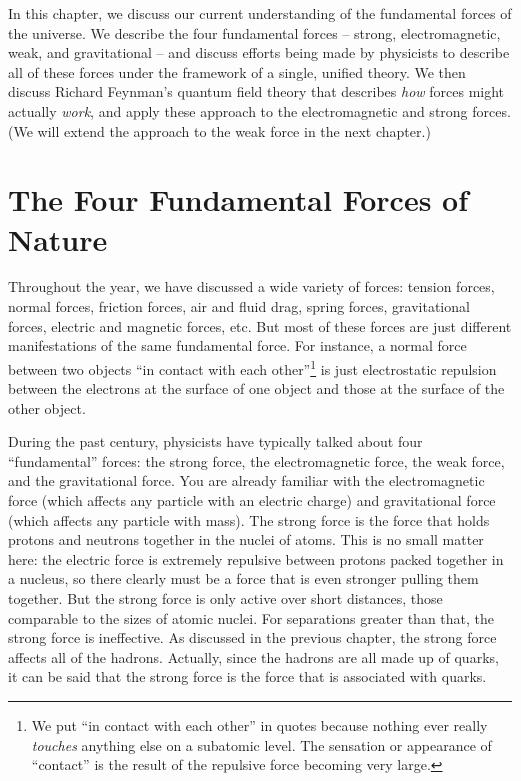 In this chapter, we discuss our current understanding of the
fundamental forces of the universe.  We describe the four
fundamental forces -- strong, electromagnetic, weak, and
gravitational -- and discuss efforts being made by physicists to
describe all of these forces under the framework of a single,
unified theory.  We then discuss Richard Feynman's quantum field
theory that describes {\it how} forces might actually {\it work},
and apply these approach to the electromagnetic and strong forces.
(We will extend the approach to the weak force in the next
chapter.)



\section{The Four Fundamental Forces of Nature}

Throughout the year, we have discussed a wide variety of forces:
tension forces, normal forces, friction forces, air and fluid
drag, spring forces, gravitational forces, electric and magnetic
forces, etc.  But most of these forces are just different
manifestations of the same fundamental force.  For instance, a
normal force between two objects ``in contact with each
other''\footnote{We put ``in contact with each other'' in quotes
because nothing ever really {\it touches} anything else on a
subatomic level.  The sensation or appearance of ``contact'' is
the result of the repulsive force becoming very large.} is just
electrostatic repulsion between the electrons at the surface of
one object and those at the surface of the other object.

During the past century, physicists have typically talked about
four ``fundamental'' forces:  the strong force, the
electromagnetic force, the weak force, and the gravitational
force.  You are already familiar with the electromagnetic force
(which affects any particle with an electric charge) and
gravitational force (which affects any particle with mass). The
strong force is the force that holds protons and neutrons together
in the nuclei of atoms. This is no small matter here: the
electric force is extremely repulsive between protons packed
together in a nucleus, so there clearly must be a force that is
even stronger pulling them together.  But the strong force is only
active over short distances, those comparable to the sizes of
atomic nuclei. For separations greater than that, the strong
force is ineffective.  As discussed in the previous chapter, the
strong force affects all of the hadrons.  Actually, since the
hadrons are all made up of quarks, it can be said that the strong
force is the force that is associated with quarks.

